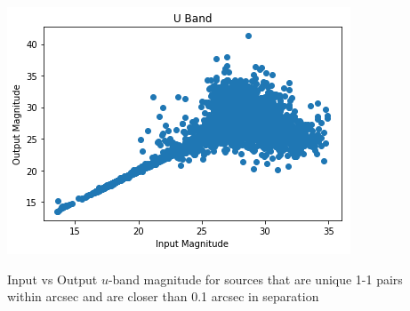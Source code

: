\documentclass{beamer}
\begin{document}
\begin{frame}
\begin{columns}
\begin{column}{7.5cm}
\begin{itemize}
      \end{itemize}
    \end{column}
    \begin{column}{5cm}
      \includegraphics[width=\linewidth]{./image.png}
      \begin{center}
\scriptsize
        Input vs Output $u$-band magnitude for sources that are unique
        1-1 pairs within arcsec and are closer than 0.1 arcsec in separation
        {\color{red}{AS: to be fixed}}
      \end{center}
    \end{column}
  \end{columns}



\end{frame}
\end{document}
